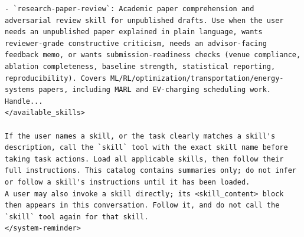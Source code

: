 \documentclass[UTF8,10pt]{ctexart}
\begin{document}
\begin{Verbatim}[breaklines=true,breakanywhere=true,fontsize=\scriptsize,frame=single,framesep=2pt]
- `research-paper-review`: Academic paper comprehension and adversarial review skill for unpublished drafts. Use when the user needs an unpublished paper explained in plain language, wants reviewer-grade constructive criticism, needs an advisor-facing feedback memo, or wants submission-readiness checks (venue compliance, ablation completeness, baseline strength, statistical reporting, reproducibility). Covers ML/RL/optimization/transportation/energy-systems papers, including MARL and EV-charging scheduling work. Handle...
</available_skills>

If the user names a skill, or the task clearly matches a skill's description, call the `skill` tool with the exact skill name before taking task actions. Load all applicable skills, then follow their full instructions. This catalog contains summaries only; do not infer or follow a skill's instructions until it has been loaded.
A user may also invoke a skill directly; its <skill_content> block then appears in this conversation. Follow it, and do not call the `skill` tool again for that skill.
</system-reminder>
\end{Verbatim}
\end{document}
